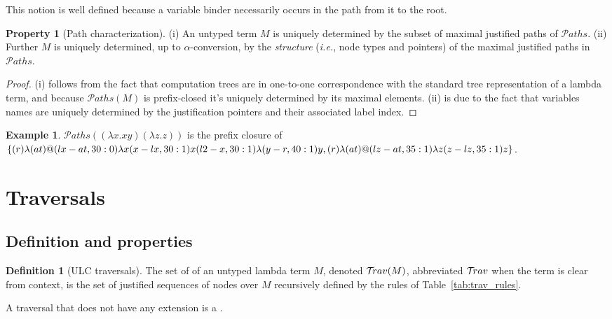 \documentclass{article}
\makeatletter
\theoremstyle{plain}
\theoremstyle{definition}
\newtheorem{definition}{Definition}[section]
\newtheorem{property}{Property}[section]
\newtheorem{example}{Example}[section]
\theoremstyle{remark}
\newcommand{\travulc}{\travset}
\newcommand\pathset{{\mathcal{P}aths}} %
\renewcommand\ie{{\it i.e.\@\xspace}}
\makeatother
\begin{document}
This notion is well defined because a variable binder necessarily occurs in the path from it to the root.
\begin{property}[Path characterization]
\label{prop:tree_path_charact}
(i) An untyped term $M$ is uniquely determined by the subset of maximal justified paths of $\pathset$.
(ii) Further $M$ is uniquely determined, up to $\alpha$-conversion, by the \emph{structure} (\ie, node types and pointers) of the maximal justified paths in $\pathset$.
\end{property}
\begin{proof}
(i) follows from the fact that computation trees are in one-to-one correspondence with the standard tree representation of a lambda term, and because $\pathset(M)$ is prefix-closed it's uniquely determined by its maximal elements. (ii) is due to the fact that variables names are uniquely determined by the justification pointers and their associated label index.
\end{proof}

\begin{example}
  $\pathset((\lambda x.x y) (\lambda z.z))$ is the prefix closure of
  $\{
  \Pstr{ (r){\lambda} (at){@} (lx-at,30:0){\lambda x} (x-lx,30:1){x} (l2-x,30:1){\lambda} (y-r,40:1){y} },
  \Pstr{ (r){\lambda} (at){@} (lz-at,35:1){\lambda z} (z-lz,35:1){z}}
  \}$.
\end{example}


\section{Traversals}

\subsection{Definition and properties}

\begin{definition}[ULC traversals]
The set of  of an untyped lambda term $M$, denoted $\travulc(M)$, abbreviated $\travulc$ when the term is clear from context, is the set of justified sequences of nodes over $M$ recursively defined by the rules of Table~\ref{tab:trav_rules}.

A traversal that does not have any extension is a .
\end{definition}
\end{document}
